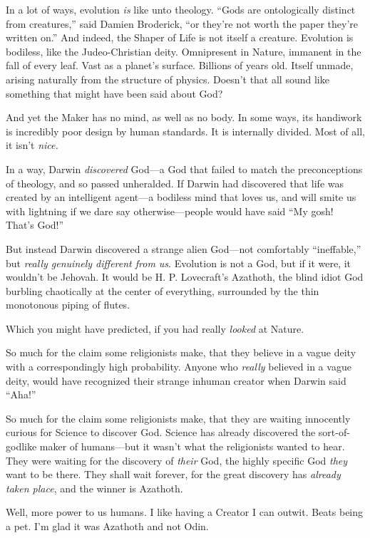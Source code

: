 {
 In a lot of ways, evolution \textit{is} like unto theology.
``Gods are ontologically distinct from
creatures,'' said Damien Broderick,
``or they're not worth the paper
they're written on.'' And indeed, the
Shaper of Life is not itself a creature. Evolution is bodiless, like
the Judeo-Christian deity. Omnipresent in Nature, immanent in the fall
of every leaf. Vast as a planet's surface. Billions of
years old. Itself unmade, arising naturally from the structure of
physics. Doesn't that all sound like something that
might have been said about God?}

{
 And yet the Maker has no mind, as well as no body. In some ways,
its handiwork is incredibly poor design by human standards. It is
internally divided. Most of all, it isn't
\textit{nice.}}

{
 In a way, Darwin \textit{discovered} God---a God that failed to
match the preconceptions of theology, and so passed unheralded. If
Darwin had discovered that life was created by an intelligent agent---a
bodiless mind that loves us, and will smite us with lightning if we
dare say otherwise---people would have said ``My gosh!
That's God!''}

{
 But instead Darwin discovered a strange alien God---not
comfortably ``ineffable,'' but
\textit{really genuinely different from us}. Evolution is not a God,
but if it were, it wouldn't be Jehovah. It would be H.
P. Lovecraft's Azathoth, the blind idiot God burbling
chaotically at the center of everything, surrounded by the thin
monotonous piping of flutes.}

{
 Which you might have predicted, if you had really \textit{looked}
at Nature.}

{
 So much for the claim some religionists make, that they believe in
a vague deity with a correspondingly high probability. Anyone who
\textit{really} believed in a vague deity, would have recognized their
strange inhuman creator when Darwin said
``Aha!''}

{
 So much for the claim some religionists make, that they are
waiting innocently curious for Science to discover God. Science has
already discovered the sort-of-godlike maker of humans---but it
wasn't what the religionists wanted to hear. They were
waiting for the discovery of \textit{their} God, the highly specific
God \textit{they} want to be there. They shall wait forever, for the
great discovery has \textit{already taken place}, and the winner is
Azathoth.}

{
 Well, more power to us humans. I like having a Creator I can
outwit. Beats being a pet. I'm glad it was Azathoth and
not Odin.}

